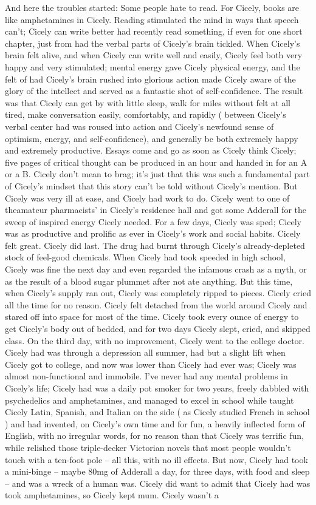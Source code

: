 \documentclass[12pt]{book}
\begin{document}
And here the troubles started: Some people hate to read. For Cicely, books are like amphetamines in Cicely. Reading stimulated the mind in ways that speech can't; Cicely can write better had recently read something, if even for one short chapter, just from had the verbal parts of Cicely's brain tickled. When Cicely's brain felt alive, and when Cicely can write well and easily, Cicely feel both very happy and very stimulated; mental energy gave Cicely physical energy, and the felt of had Cicely's brain rushed into glorious action made Cicely aware of the glory of the intellect and served as a fantastic shot of self-confidence. The result was that Cicely can get by with little sleep, walk for miles without felt at all tired, make conversation easily, comfortably, and rapidly ( between Cicely's verbal center had was roused into action and Cicely's newfound sense of optimism, energy, and self-confidence), and generally be both extremely happy and extremely productive. Essays come and go as soon as Cicely think Cicely; five pages of critical thought can be produced in an hour and handed in for an A or a B. Cicely don't mean to brag; it's just that this was such a fundamental part of Cicely's mindset that this story can't be told without Cicely's mention. But Cicely was very ill at ease, and Cicely had work to do. Cicely went to one of theamateur pharmacists' in Cicely's residence hall and got some Adderall for the sweep of inspired energy Cicely needed. For a few days, Cicely was sped; Cicely was as productive and prolific as ever in Cicely's work and social habits. Cicely felt great. Cicely did last. The drug had burnt through Cicely's already-depleted stock of feel-good chemicals. When Cicely had took speeded in high school, Cicely was fine the next day and even regarded the infamous crash as a myth, or as the result of a blood sugar plummet after not ate anything. But this time, when Cicely's supply ran out, Cicely was completely ripped to pieces. Cicely cried all the time for no reason. Cicely felt detached from the world around Cicely and stared off into space for most of the time. Cicely took every ounce of energy to get Cicely's body out of bedded, and for two days Cicely slept, cried, and skipped class. On the third day, with no improvement, Cicely went to the college doctor. Cicely had was through a depression all summer, had but a slight lift when Cicely got to college, and now was lower than Cicely had ever was; Cicely was almost non-functional and immobile. I've never had any mental problems in Cicely's life; Cicely had was a daily pot smoker for two years, freely dabbled with psychedelics and amphetamines, and managed to excel in school while taught Cicely Latin, Spanish, and Italian on the side ( as Cicely studied French in school ) and had invented, on Cicely's own time and for fun, a heavily inflected form of English, with no irregular words, for no reason than that Cicely was terrific fun, while relished those triple-decker Victorian novels that most people wouldn't touch with a ten-foot pole -- all this, with no ill effects. But now, Cicely had took a mini-binge -- maybe 80mg of Adderall a day, for three days, with food and sleep -- and was a wreck of a human was. Cicely did want to admit that Cicely had was took amphetamines, so Cicely kept mum. Cicely wasn't a 
\end{document}

